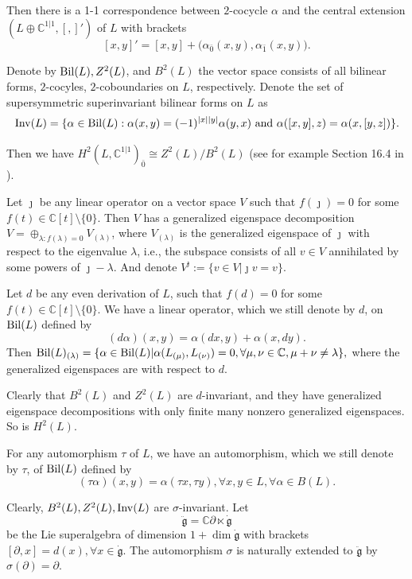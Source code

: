 \documentclass[1p]{elsarticle}
\numberwithin{equation}{section}
\def\dg{\dot{\mathfrak{g}}}
\def\fg{\mathfrak{g}}
\def\bC{\mathbb{C}}
\def\Inv{{\rm Inv}}
\def\Bil{{\rm Bil}}
\begin{document}
Then there is a 1-1 correspondence between $2$-cocycle $\alpha$  and the central extension $(L\oplus \bC^{1|1},[,]')$ of $L$ with brackets
$$[x,y]'=[x,y]+\big(\alpha_{\bar 0}(x,y),\alpha_{\bar 1}(x,y)\big).$$





Denote by $\Bil(L), Z^2(L)$, and $B^2(L)$  the vector space consists of all bilinear forms, $2$-cocyles, $2$-coboundaries   on $L$, respectively. Denote the set of  supersymmetric superinvariant bilinear forms on $L$ as
$$ \Inv(L)=\{   \alpha\in \Bil(L): \alpha(x,y)=(-1)^{|x||y|}\alpha(y,x)\text{ and }\alpha([x,y],z)=\alpha(x,[y,z])\}.$$





 Then we have $H^2(L,\bC^{1|1})_{\bar 0}\cong Z^2(L)/B^2(L)$ (see for example Section 16.4 in \cite{Mu}).

Let $\jmath$ be any linear operator on a vector space $V$ such that $f(\jmath)=0$ for some $ f(t)\in \bC[t]\setminus\{0\}$. Then $V$ has a generalized  eigenspace decomposition $V=\oplus_{\lambda: f(\lambda)=0} V_{(\lambda)}$, where   $V_{(\lambda)}$ is the generalized  eigenspace of $\jmath$ with respect to the eigenvalue $\lambda$, i.e.,
the subspace consists of all $v\in V$   annihilated by some powers of $\jmath-\lambda$. And denote  $V^{\jmath}:=\{v\in V|\jmath v=v\}$.


Let $d$ be any even derivation of $L$, such that $f(d)=0$ for some $ f(t)\in \bC[t]\setminus\{0\}$. We have a linear operator, which we still denote by $d$, on $\Bil(L)$ defined by
$$ (d\alpha)(x,y)=\alpha(dx,y)+\alpha(x,dy).$$
Then $\Bil(L)_{(\lambda)}=\{\alpha\in \Bil(L)|\alpha(L_{(\mu)},L_{(\nu)})=0,\forall \mu,\nu\in \bC, \mu+\nu\ne \lambda\},$
where the generalized eigenspaces are with respect to $d$.

Clearly that $B^2(L)$ and $Z^2(L)$ are $d$-invariant, and  they have generalized  eigenspace decompositions with only finite many nonzero generalized  eigenspaces. So is $H^2(L)$.

For any automorphism $\tau$ of $L$, we have an automorphism, which we still denote by $\tau$, of $\Bil(L)$ defined by
$$(\tau \alpha)(x,y)=\alpha(\tau x,\tau y),\forall x,y\in L,\forall \alpha\in B(L).$$

Clearly, $B^2(L),Z^2(L), \Inv(L)$ are $\sigma$-invariant. Let \begin{equation}\ddot{\fg}=\bC \partial\ltimes \dg\end{equation} be the Lie superalgebra of dimension $1+\dim \dg$ with brackets $[\partial,x]=d(x),\forall x\in \dg$. The automorphism $\sigma$ is naturally extended to $\ddot{\fg}$ by $\sigma(\partial)=\partial$.
\end{document}

